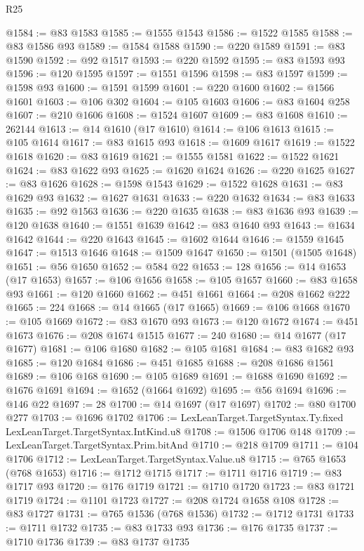 \begin{lexlean}{R25}
\begin{coremodule}
@1584 := @83 @1583
@1585 := @1555 @1543
@1586 := @1522 @1585
@1588 := @83 @1586 @93
@1589 := @1584 @1588
@1590 := @220 @1589
@1591 := @83 @1590
@1592 := @92 @1517
@1593 := @220 @1592
@1595 := @83 @1593 @93
@1596 := @120 @1595
@1597 := @1551 @1596
@1598 := @83 @1597
@1599 := @1598 @93
@1600 := @1591 @1599
@1601 := @220 @1600
@1602 := @1566 @1601
@1603 := @106 @302
@1604 := @105 @1603
@1606 := @83 @1604 @258
@1607 := @210 @1606
@1608 := @1524 @1607
@1609 := @83 @1608
@1610 := 262144
@1613 := @14 @1610 (@17 @1610)
@1614 := @106 @1613
@1615 := @105 @1614
@1617 := @83 @1615 @93
@1618 := @1609 @1617
@1619 := @1522 @1618
@1620 := @83 @1619
@1621 := @1555 @1581
@1622 := @1522 @1621
@1624 := @83 @1622 @93
@1625 := @1620 @1624
@1626 := @220 @1625
@1627 := @83 @1626
@1628 := @1598 @1543
@1629 := @1522 @1628
@1631 := @83 @1629 @93
@1632 := @1627 @1631
@1633 := @220 @1632
@1634 := @83 @1633
@1635 := @92 @1563
@1636 := @220 @1635
@1638 := @83 @1636 @93
@1639 := @120 @1638
@1640 := @1551 @1639
@1642 := @83 @1640 @93
@1643 := @1634 @1642
@1644 := @220 @1643
@1645 := @1602 @1644
@1646 := @1559 @1645
@1647 := @1513 @1646
@1648 := @1509 @1647
@1650 := @1501 (@1505 @1648)
@1651 := @56 @1650
@1652 := @584 @22
@1653 := 128
@1656 := @14 @1653 (@17 @1653)
@1657 := @106 @1656
@1658 := @105 @1657
@1660 := @83 @1658 @93
@1661 := @120 @1660
@1662 := @451 @1661
@1664 := @208 @1662 @222
@1665 := 224
@1668 := @14 @1665 (@17 @1665)
@1669 := @106 @1668
@1670 := @105 @1669
@1672 := @83 @1670 @93
@1673 := @120 @1672
@1674 := @451 @1673
@1676 := @208 @1674 @1515
@1677 := 240
@1680 := @14 @1677 (@17 @1677)
@1681 := @106 @1680
@1682 := @105 @1681
@1684 := @83 @1682 @93
@1685 := @120 @1684
@1686 := @451 @1685
@1688 := @208 @1686 @1561
@1689 := @106 @168
@1690 := @105 @1689
@1691 := @1688 @1690
@1692 := @1676 @1691
@1694 := @1652 (@1664 @1692)
@1695 := @56 @1694
@1696 := @146 @22
@1697 := 28
@1700 := @14 @1697 (@17 @1697)
@1702 := @80 @1700 @277
@1703 := @1696 @1702
@1706 := LexLeanTarget.TargetSyntax.Ty.fixed LexLeanTarget.TargetSyntax.IntKind.u8
@1708 := @1506 @1706 @148
@1709 := LexLeanTarget.TargetSyntax.Prim.bitAnd
@1710 := @218 @1709
@1711 := @104 @1706
@1712 := LexLeanTarget.TargetSyntax.Value.u8
@1715 := @765 @1653 (@768 @1653)
@1716 := @1712 @1715
@1717 := @1711 @1716
@1719 := @83 @1717 @93
@1720 := @176 @1719
@1721 := @1710 @1720
@1723 := @83 @1721 @1719
@1724 := @1101 @1723
@1727 := @208 @1724 @1658 @108
@1728 := @83 @1727
@1731 := @765 @1536 (@768 @1536)
@1732 := @1712 @1731
@1733 := @1711 @1732
@1735 := @83 @1733 @93
@1736 := @176 @1735
@1737 := @1710 @1736
@1739 := @83 @1737 @1735

\end{coremodule}
\end{lexlean}
